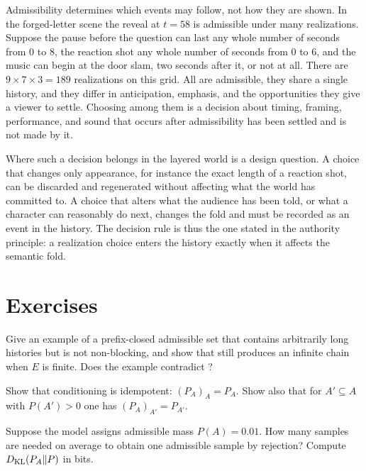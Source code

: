 Admissibility determines which events may follow, not how they are shown. In the forged-letter scene the reveal at $t=58$ is admissible under many realizations. Suppose the pause before the question can last any whole number of seconds from $0$ to $8$, the reaction shot any whole number of seconds from $0$ to $6$, and the music can begin at the door slam, two seconds after it, or not at all. There are $9\times7\times3=189$ realizations on this grid. All are admissible, they share a single history, and they differ in anticipation, emphasis, and the opportunities they give a viewer to settle. Choosing among them is a decision about timing, framing, performance, and sound that occurs after admissibility has been settled and is not made by it.

Where such a decision belongs in the layered world is a design question. A choice that changes only appearance, for instance the exact length of a reaction shot, can be discarded and regenerated without affecting what the world has committed to. A choice that alters what the audience has been told, or what a character can reasonably do next, changes the fold and must be recorded as an event in the history. The decision rule is thus the one stated in the authority principle: a realization choice enters the history exactly when it affects the semantic fold.

\section*{Exercises}

\begin{exercise}
Give an example of a prefix-closed admissible set that contains arbitrarily long histories but is not non-blocking, and show that  still produces an infinite chain when $E$ is finite. Does the example contradict ?
\end{exercise}

\begin{exercise}
Show that conditioning is idempotent: $(P_A)_A=P_A$. Show also that for $A'\subseteq A$ with $P(A')>0$ one has $(P_A)_{A'}=P_{A'}$.
\end{exercise}

\begin{exercise}
Suppose the model assigns admissible mass $P(A)=0.01$. How many samples are needed on average to obtain one admissible sample by rejection? Compute $D_{\mathrm{KL}}(P_A\|P)$ in bits.
\end{exercise}
